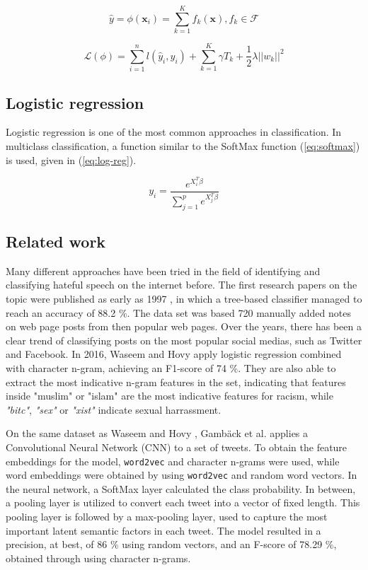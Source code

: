 \documentclass[twocolumn]{article}
\begin{document}
\begin{equation}
\label{eq:xg-pred-func}
\hat{y} = \phi(\mathbf{x}_i) = \sum_{k=1}^K f_k(\mathbf{x}), f_k \in \mathcal{F}
\end{equation}

\begin{equation}
\label{eq:xg-obj-func}
\mathcal{L}(\phi) = \sum_{i = 1}^n l(\hat{y}_i, y_i) + \sum_{k = 1}^K \gamma T_k + \frac{1}{2} \lambda||w_k||^2
\end{equation}

\subsection{Logistic regression}

Logistic regression is one of the most common approaches in classification. In multiclass classification, a function similar to the SoftMax function (\ref{eq:softmax}) is used, given in (\ref{eq:log-reg}). 

\begin{equation}
\label{eq:log-reg}
y_i = \frac{e^{X_i^T\beta}}{\sum_{j=1}^p e^{X_j^T\beta}}
\end{equation}

\subsection{Related work}

Many different approaches have been tried in the field of identifying and classifying hateful speech on the internet before. The first research papers on the topic were published as early as 1997 \cite{smokey}, in which a tree-based classifier managed to reach an accuracy of 88.2 \%. The data set was based 720 manually added notes on web page posts from then popular web pages. \cite{smokey} Over the years, there has been a clear trend of classifying posts on the most popular social medias, such as Twitter and Facebook. In 2016, Waseem and Hovy \cite{Waseem2016HatefulSO} apply logistic regression combined with character n-gram, achieving an F1-score of 74 \%. They are also able to extract the most indicative n-gram features in the set, indicating that features inside "muslim" or "islam" are the most indicative features for racism, while \textit{"bitc"}, \textit{"sex"} or \textit{"xist"} indicate sexual harrassment. 

On the same dataset as Waseem and Hovy \cite{Waseem2016HatefulSO}, Gamb\"ack et al. \cite{Gambck2017} applies a Convolutional Neural Network (CNN) to a set of tweets. To obtain the feature embeddings for the model, \verb|word2vec| and character n-grams were used, while word embeddings were obtained by using \verb|word2vec| and random word vectors. In the neural network, a SoftMax layer calculated the class probability. In between, a pooling layer is utilized to convert each tweet into a vector of fixed length. This pooling layer is followed by a max-pooling layer, used to capture the most important latent semantic factors in each tweet. The model resulted in a precision, at best, of 86 \% using random vectors, and an F-score of 78.29 \%, obtained through using character n-grams. 
\end{document}
